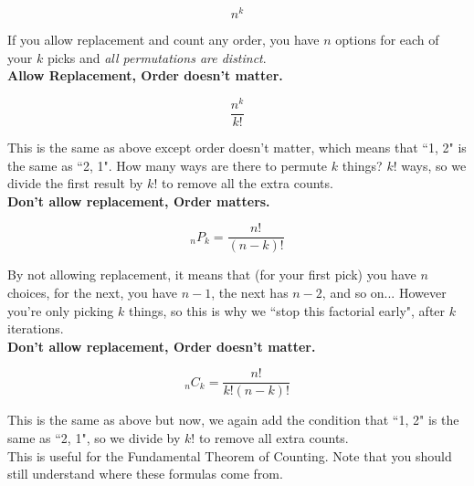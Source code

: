 \documentclass[12pt,letterpaper]{article}
\begin{document}
\begin{multicols*}{2}
        \[
            n^k
        \]

        If you allow replacement and count any order, you have $n$
        options for each of your $k$ picks and {\it all permutations are
        distinct}. \\

        {\bf Allow Replacement, Order doesn't matter.}

        \[
            \frac{n^k}{k!}
        \]

        This is the same as above except order doesn't matter, which
        means that ``1, 2" is the same as ``2, 1". How many ways are
        there to permute $k$ things? $k!$ ways, so we divide the first
        result by $k!$ to remove all the extra counts. \\

        {\bf Don't allow replacement, Order matters.}

        \[
            _{n}P_k = \frac{n!}{(n - k)!}
        \]

        By not allowing replacement, it means that (for your first pick)
        you have $n$ choices, for the next, you have $n - 1$, the next
        has $n - 2$, and so on... However you're only picking $k$
        things, so this is why we ``stop this factorial early", after
        $k$ iterations. \\

        {\bf Don't allow replacement, Order doesn't matter.}

        \[
            _{n}C_k = \frac{n!}{k!(n - k)!}
        \]

        This is the same as above but now, we again add the condition
        that ``1, 2" is the same as ``2, 1", so we divide by $k!$ to
        remove all extra counts. \\

        This is useful for the Fundamental Theorem of Counting. Note that
        you should still understand where these formulas come from.



    \end{multicols*}
\end{document}
